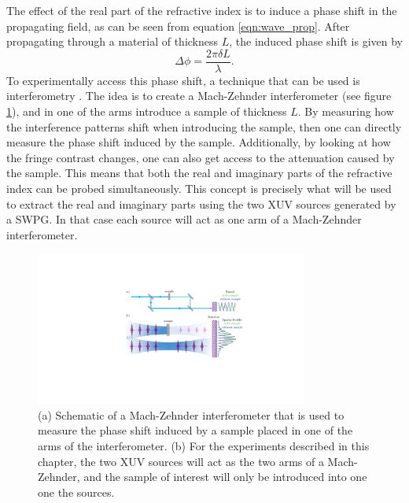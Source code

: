 The effect of the real part of the refractive index is to induce a phase shift in the propagating field, as can be seen from equation \ref{eqn:wave_prop}.  After propagating through a material of thickness $L$, the induced phase shift is given by
\begin{equation}
\label{eqn:phase_shift}
	\Delta\phi=\frac{2\pi\delta L}{\lambda}.
\end{equation}
To experimentally access this phase shift, a technique that can be used is interferometry \cite{hemmersDirectMeasurementComplex2012, hemmersMulticolorXUVInterferometry2009, wilsonDoubleSlitInterferometry2012}. The idea is to create a Mach-Zehnder interferometer (see figure \ref{fig:mach-zehnder_interferometer}), and in one of the arms introduce a sample of thickness $L$. By measuring how the interference patterns shift when introducing the sample, then one can directly measure the phase shift induced by the sample.  Additionally, by looking at how the fringe contrast changes, one can also get access to the attenuation caused by the sample.  This means that both the real and imaginary parts of the refractive index can be probed simultaneously.  This concept is precisely what will be used to extract the real and imaginary parts using the two XUV sources generated by a SWPG.  In that case each source will act as one arm of a Mach-Zehnder interferometer.
\begin{figure}
	\centering
	\includegraphics[width=0.8\textwidth]{figures/refractive_index/mach-zehnder_two_source.pdf}
	\caption[Schematic of Mach-Zehnder interferometer and spatial profile with and without a sample in one arm of the interferometer]{(a) Schematic of a Mach-Zehnder interferometer that is used to measure the phase shift induced by a sample placed in one of the arms of the interferometer. (b) For the experiments described in this chapter, the two XUV sources will act as the two arms of a Mach-Zehnder, and the sample of interest will only be introduced into one one the sources.}
	\label{fig:mach-zehnder_interferometer}
\end{figure}

